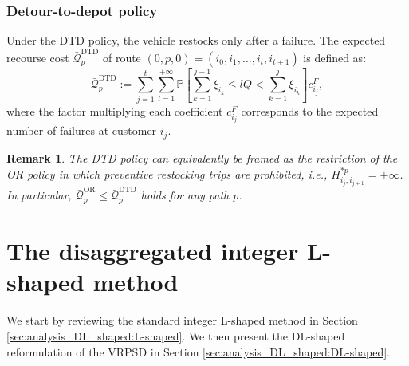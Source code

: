 \documentclass{article}
\newtheorem{remark}{Remark}
\newcommand{\rev}[1]{{\color{black}#1}}
\begin{document}
\subsubsection{Detour-to-depot policy}\label{sec:DTD_pol}
 
Under the DTD policy, \rev{the vehicle restocks only after a failure}. The expected recourse cost $\bar{\mathcal{Q}}^{\text{DTD}}_p$ of route $(0, p, 0) = (i_0, i_{1}, \dots, i_{t}, i_{t+1})$ is defined as:
\begin{equation}\label{rec:DTD}
    \bar{\mathcal{Q}}^{\text{DTD}}_p := \sum_{j=1}^t\sum_{l=1}^{+\infty}\mathbb{P}\left[ \sum_{k=1}^{j-1}\xi_{i_k} \leq lQ < \sum_{k=1}^j\xi_{i_k} \right]c^F_{i_{j}},
\end{equation}
where the factor multiplying each coefficient $c^F_{i_{j}}$ corresponds to the expected number of failures at customer $i_j$.

\rev{
\begin{remark}\label{rem:DTD_restriction_of_OR}
    The DTD policy can equivalently be framed as the restriction of the OR policy in which preventive restocking trips are prohibited, i.e., $H^{*p}_{i_j,i_{j+1}} = +\infty$. In particular, $\bar{\mathcal{Q}}^{\text{OR}}_p \leq \bar{\mathcal{Q}}^{\text{DTD}}_p$ holds for any path $p$.
\end{remark}
}

\section{The disaggregated integer L-shaped method} \label{sec:analysis_DL_shaped}
We start by reviewing the standard integer L-shaped method in Section \ref{sec:analysis_DL_shaped:L-shaped}. We then present the DL-shaped reformulation of the VRPSD in Section \ref{sec:analysis_DL_shaped:DL-shaped}.

\end{document}
